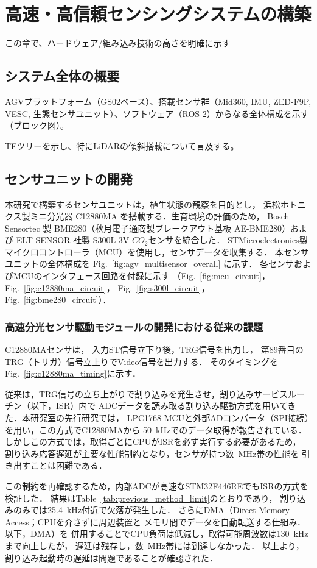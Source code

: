 \documentclass[main]{subfiles}
\begin{document}
\chapter{高速・高信頼センシングシステムの構築}
この章で、ハードウェア/組み込み技術の高さを明確に示す
\section{システム全体の概要}
AGVプラットフォーム（GS02ベース）、搭載センサ群（Mid360, IMU, ZED-F9P, VESC, 生態センサユニット）、ソフトウェア（ROS 2）からなる全体構成を示す（ブロック図）。

TFツリーを示し、特にLiDARの傾斜搭載について言及する。

\section{センサユニットの開発}
本研究で構築するセンサユニットは，植生状態の観察を目的とし，
浜松ホトニクス製ミニ分光器 C12880MA を搭載する．生育環境の評価のため，
Bosch Sensortec 製 BME280（秋月電子通商製ブレークアウト基板 AE-BME280）および 
ELT SENSOR 社製 S300L-3V $CO_2$センサを統合した．
STMicroelectronics製マイクロコントローラ（MCU）を使用し，センサデータを収集する．
本センサユニットの全体構成を Fig.~\ref{fig:agv_multisensor_overall} に示す．
各センサおよびMCUのインタフェース回路を付録に示す
（Fig.~\ref{fig:mcu_circuit}，Fig.~\ref{fig:c12880ma_circuit}，
Fig.~\ref{fig:s300l_circuit}，Fig.~\ref{fig:bme280_circuit}）．

\subsection{高速分光センサ駆動モジュールの開発における従来の課題} 
C12880MAセンサは，
入力ST信号立下り後，TRG信号を出力し，
第89番目のTRG（トリガ）信号立上りでVideo信号を出力する．
そのタイミングをFig.~\ref{fig:c12880ma_timing}に示す．

従来は，TRG信号の立ち上がりで割り込みを発生させ，割り込みサービスルーチン（以下，ISR）内で
ADCデータを読み取る割り込み駆動方式を用いてきた．本研究室の先行研究では，
LPC1768 MCUと外部ADコンバータ（SPI接続）を用い，この方式でC12880MAから
\SI{50}{\kilo\hertz}でのデータ取得が報告されている\cite{ref:Kobayashi2021AGV}．
しかしこの方式では，取得ごとにCPUがISRを必ず実行する必要があるため，
割り込み応答遅延が主要な性能制約となり，センサが持つ数\SI{}{\mega\hertz}帯の性能を
引き出すことは困難である．

この制約を再確認するため，内部ADCが高速なSTM32F446REでもISRの方式を検証した．
結果はTable~\ref{tab:previous_method_limit}のとおりであり，
割り込みのみでは\SI{25.4}{\kilo\hertz}付近で欠落が発生した．
さらにDMA（Direct Memory Access；CPUを介さずに周辺装置と
メモリ間でデータを自動転送する仕組み．以下，DMA）を
併用することでCPU負荷は低減し，取得可能周波数は\SI{130}{\kilo\hertz}まで向上したが，
遅延は残存し，数\SI{}{\mega\hertz}帯には到達しなかった．
以上より，割り込み起動時の遅延は問題であることが確認された．
\end{document}
